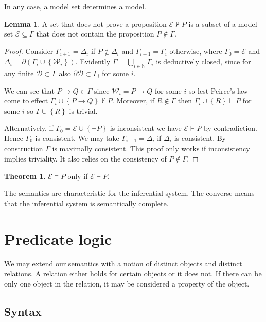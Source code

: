\documentclass{amsbook}
\newcommand{\setsm}[1]{\left\{#1\right\}}
\newcommand{\wffs}{\mathcal W}
\newcommand{\infers}{\mathrel\vdash}
\newcommand{\valids}{\mathrel\vDash}
\newcommand{\then}{\mathrel\rightarrow}
\theoremstyle{definition}
\newtheorem{thm}{Theorem}[section]
\newtheorem{lmm}{Lemma}[section]
\begin{document}
In any case, a model set determines a model.

\begin{lmm}
    A set that does not prove a proposition $\mathcal E \nvdash P$ is a subset of a model set $\mathcal E \subseteq \Gamma$ that does not contain the proposition $P \notin \Gamma$.
    \begin{proof}
        Consider $\Gamma_{i+1} = \Delta_i$ if $P \notin \Delta_i$ and $\Gamma_{i+1} = \Gamma_i$ otherwise, where $\Gamma_0 = \mathcal E$ and $\Delta_i = \partial(\Gamma_i \cup \setsm {\wffs_i})$.
        Evidently $\Gamma = \bigcup_{i \in \mathbb N} \Gamma_i$ is deductively closed, since for any finite $\mathcal D \subset \Gamma$ also $\partial\mathcal D \subset \Gamma_i$ for some $i$.

        We can see that $P \then Q \in \Gamma$ since $\wffs_i = P \then Q$ for some $i$ so lest Peirce's law come to effect $\Gamma_i \cup \setsm{P \then Q} \nvdash P$. Moreover, if $R \notin \Gamma$ then $\Gamma_i \cup \setsm R \infers P$ for some $i$ so $\Gamma \cup \setsm R$ is trivial.

        Alternatively, if $\Gamma_0 = \mathcal E \cup \setsm {\neg P}$ is inconsistent we have $\mathcal E \infers P$ by contradiction. Hence $\Gamma_0$ is consistent. We may take $\Gamma_{i+1} = \Delta_i$ if $\Delta_i$ is consistent. By construction $\Gamma$ is maximally consistent. This proof only works if inconsistency implies triviality. It also relies on the consistency of $P \notin \Gamma$.
    \end{proof}
\end{lmm}

\begin{thm}
    $\mathcal E \valids P$ only if $\mathcal E \infers P$.

    The semantics are characteristic for the inferential system. The converse means that the inferential system is semantically complete.
\end{thm}

\chapter{Predicate logic}

We may extend our semantics with a notion of distinct objects and distinct relations. A relation either holds for certain objects or it does not. If there can be only one object in the relation, it may be considered a property of the object.

\section{Syntax}
\end{document}
